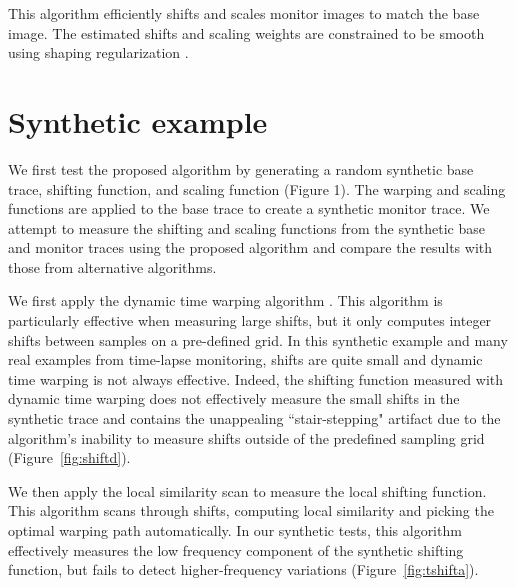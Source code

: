 This algorithm efficiently shifts and scales monitor images to match the base 
image. The estimated shifts and scaling weights are constrained to be smooth 
using shaping regularization \cite[]{fomel07}.

\section{Synthetic example}


We first test the proposed algorithm by generating a random synthetic base 
trace, shifting function, and scaling function 
(Figure 1). The warping and 
scaling functions are applied to the base trace to create a synthetic monitor 
trace. We attempt to measure the shifting and scaling 
functions from the synthetic base and monitor traces using the proposed 
algorithm and compare the results with those from alternative algorithms.

We first apply the dynamic time warping algorithm 
\cite[]{sakoe,herrera,hale13}. This algorithm is particularly effective when 
measuring large shifts, but it only computes integer shifts between samples on 
a pre-defined grid. In this synthetic example and many real examples from 
time-lapse monitoring, shifts are quite small and dynamic time warping is not 
always effective. Indeed, the shifting function measured with dynamic time 
warping does not effectively measure the small shifts in the synthetic trace 
and contains the unappealing ``stair-stepping" artifact due to the algorithm's 
inability to measure shifts outside of the predefined sampling grid 
(Figure~\ref{fig:shiftd}).

We then apply the local similarity scan \cite[]{fomel07,fomel09} to measure the 
local shifting function. This algorithm scans through shifts, computing local 
similarity and picking the optimal warping path automatically. In our synthetic 
tests, this algorithm effectively measures the low frequency component of the 
synthetic shifting function, but fails to detect higher-frequency variations
(Figure~\ref{fig:tshifta}).

